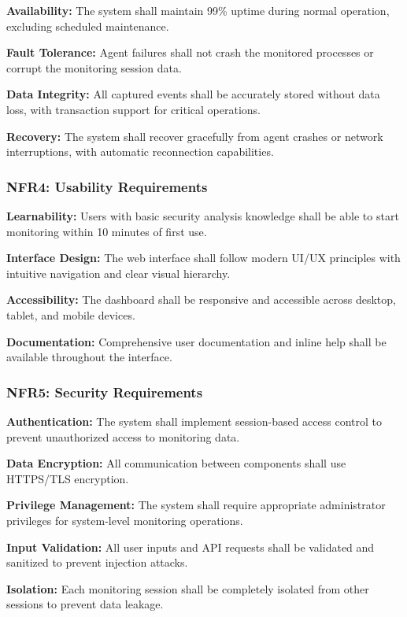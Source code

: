 \textbf{Availability:} The system shall maintain 99\% uptime during normal operation, excluding scheduled maintenance.

\textbf{Fault Tolerance:} Agent failures shall not crash the monitored processes or corrupt the monitoring session data.

\textbf{Data Integrity:} All captured events shall be accurately stored without data loss, with transaction support for critical operations.

\textbf{Recovery:} The system shall recover gracefully from agent crashes or network interruptions, with automatic reconnection capabilities.

\subsubsection{NFR4: Usability Requirements}

\textbf{Learnability:} Users with basic security analysis knowledge shall be able to start monitoring within 10 minutes of first use.

\textbf{Interface Design:} The web interface shall follow modern UI/UX principles with intuitive navigation and clear visual hierarchy.

\textbf{Accessibility:} The dashboard shall be responsive and accessible across desktop, tablet, and mobile devices.

\textbf{Documentation:} Comprehensive user documentation and inline help shall be available throughout the interface.

\subsubsection{NFR5: Security Requirements}

\textbf{Authentication:} The system shall implement session-based access control to prevent unauthorized access to monitoring data.

\textbf{Data Encryption:} All communication between components shall use HTTPS/TLS encryption.

\textbf{Privilege Management:} The system shall require appropriate administrator privileges for system-level monitoring operations.

\textbf{Input Validation:} All user inputs and API requests shall be validated and sanitized to prevent injection attacks.

\textbf{Isolation:} Each monitoring session shall be completely isolated from other sessions to prevent data leakage.

